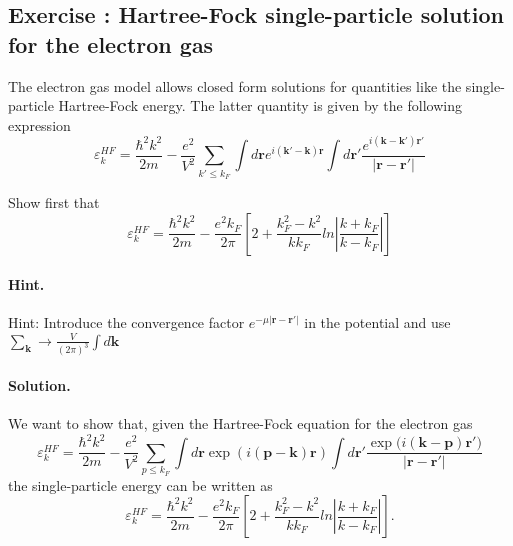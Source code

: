 \documentclass[graybox,sectrefs,envcountresetchap,open=right]{svmonodo}
\newenvironment{doconceexercise}{}{}
\newcounter{doconceexercisecounter}
\begin{document}
\begin{doconceexercise}

\subsection*{Exercise \thedoconceexercisecounter: Hartree-Fock single-particle solution for the electron gas}


The electron gas model allows closed form solutions for quantities like the 
single-particle Hartree-Fock energy.  The latter quantity is given by the following expression
\[
\varepsilon_{k}^{HF}=\frac{\hbar^{2}k^{2}}{2m}-\frac{e^{2}}
{V^{2}}\sum_{k'\leq
k_{F}}\int d\mathbf{r}e^{i(\mathbf{k'}-\mathbf{k})\mathbf{r}}\int
d\mathbf{r}'\frac{e^{i(\mathbf{k}-\mathbf{k'})\mathbf{r}'}}
{\vert\mathbf{r}-\mathbf{r'}\vert}
\]


Show first that
\[
\varepsilon_{k}^{HF}=\frac{\hbar^{2}k^{2}}{2m}-\frac{e^{2}
k_{F}}{2\pi}
\left[
2+\frac{k_{F}^{2}-k^{2}}{kk_{F}}ln\left\vert\frac{k+k_{F}}
{k-k_{F}}\right\vert
\right]
\]


\paragraph{Hint.}
Hint: Introduce the convergence factor 
$e^{-\mu\vert\mathbf{r}-\mathbf{r}'\vert}$
in the potential and use  $\sum_{\mathbf{k}}\rightarrow
\frac{V}{(2\pi)^{3}}\int d\mathbf{k}$



\paragraph{Solution.}
We want to show that, given the Hartree-Fock equation for the electron gas
\[
\varepsilon_{k}^{HF}=\frac{\hbar^{2}k^{2}}{2m}-\frac{e^{2}}
{V^{2}}\sum_{p\leq
k_{F}}\int d\mathbf{r}\exp{(i(\mathbf{p}-\mathbf{k})\mathbf{r})}\int
d\mathbf{r}'\frac{\exp{(i(\mathbf{k}-\mathbf{p})\mathbf{r}'})}
{\vert\mathbf{r}-\mathbf{r'}\vert}
\]
the single-particle energy can be written as
\[
\varepsilon_{k}^{HF}=\frac{\hbar^{2}k^{2}}{2m}-\frac{e^{2}
k_{F}}{2\pi}
\left[
2+\frac{k_{F}^{2}-k^{2}}{kk_{F}}ln\left\vert\frac{k+k_{F}}
{k-k_{F}}\right\vert
\right].
\]


\end{doconceexercise}
\end{document}
